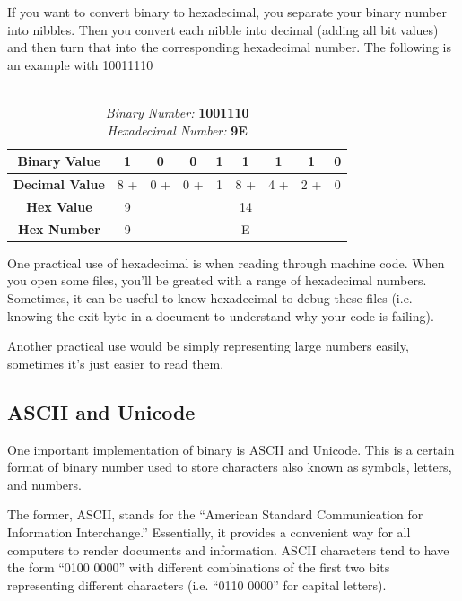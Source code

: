 \documentclass[12pt,a4paper]{book}
\begin{document}
			If you want to convert binary to hexadecimal, you separate your binary number into nibbles. Then you convert each nibble into decimal (adding all bit values) and then turn that into the corresponding hexadecimal number. The following is an example with 10011110
				\begin{table}[H]
					\centering
					\label{tab:binary4}
					\begin{tabular}{c||c|c|c|c||c|c|c|c|}
						\textbf{Binary Value} & 1 & 0 & 0 & 1 & 1 & 1 & 1 & 0 \\
						\hline
						\textbf{Decimal Value} & 8 + & 0 + & 0 + & 1 & 8 + & 4 + & 2 + & 0 \\
						\hline
						\textbf{Hex Value} & 9 &&&& 14 &&&\\
						\hline
						\textbf{Hex Number} & 9 &&&& E &&&\\
					\end{tabular}
					\caption{ \\
						\textit{Binary Number:} \textbf{1001110} \\ \textit{Hexadecimal Number:} \textbf{9E}}
				\end{table}
			One practical use of hexadecimal is when reading through machine code. When you open some files, you'll be greated with a range of hexadecimal numbers. Sometimes, it can be useful to know hexadecimal to debug these files (i.e. knowing the exit byte in a document to understand why your code is failing). 
			
			Another practical use would be simply representing large numbers easily, sometimes it's just easier to read them. 
			
			\subsection{ASCII and Unicode}
				One important implementation of binary is ASCII and Unicode. This is a certain format of binary number used to store characters also known as symbols, letters, and numbers. 
				
				The former, ASCII, stands for the ``American Standard Communication for Information Interchange.'' Essentially, it provides a convenient way for all computers to render documents and information. ASCII characters tend to have the form ``0100 0000'' with different combinations of the first two bits representing different characters (i.e. ``0110 0000'' for capital letters).
				
\end{document}
